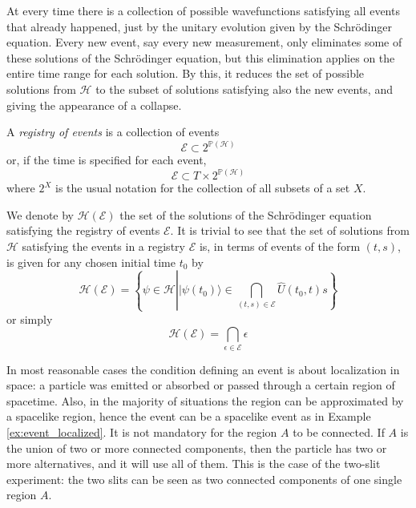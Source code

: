 \documentclass[11pt]{amsart}
\theoremstyle{definition}
\theoremstyle{plain}
\begin{document}
At every time there is a collection of possible wavefunctions satisfying all events that already happened, just by the unitary evolution given by the Schr\"odinger equation. Every new event, say every new measurement, only eliminates some of these solutions of the Schr\"odinger equation, but this elimination applies on the entire time range for each solution. By this, it reduces the set of possible solutions from $\mathscr{H}$ to the subset of solutions satisfying also the new events, and giving the appearance of a collapse.

A \emph{registry of events} is a collection of events
\begin{equation}
\mathcal E\subset 2^{\mathbb P(\mathscr{H})}
\end{equation}
or, if the time is specified for each event,
\begin{equation}
\mathcal E\subset T\times 2^{\mathbb P(\mathcal{H})}
\end{equation}
where $2^X$ is the usual notation for the collection of all subsets of a set $X$.

We denote by $\mathscr{H}(\mathcal E)$ the set of the solutions of the Schr\"odinger equation satisfying the registry of events $\mathcal E$.
It is trivial to see that the set of solutions from $\mathscr{H}$ satisfying the events in a registry $\mathcal E$ is,
in terms of events of the form $(t,s)$, is given for any chosen initial time $t_0$ by
\begin{equation}
\label{eq:registry_temporal}
\mathscr{H}(\mathcal E) = \left\{\psi\in\mathscr{H}\left||{\psi(t_0)}\rangle\in\bigcap_{(t,s)\in\mathcal E}\hat U(t_0,t)s\right\}\right.
\end{equation}
or simply
\begin{equation}
\label{eq:registry_timeless}
\mathscr{H}(\mathcal E)=\bigcap_{\epsilon\in\mathcal E}\epsilon
\end{equation}

In most reasonable cases the condition defining an event is about localization in space: a particle was emitted or absorbed or passed through a certain region of spacetime. Also, in the majority of situations the region can be approximated by a spacelike region, hence the event can be a spacelike event as in Example \ref{ex:event_localized}. It is not mandatory for the region $A$ to be connected. If $A$ is the union of two or more connected components, then the particle has two or more alternatives, and it will use all of them. This is the case of the two-slit experiment: the two slits can be seen as two connected components of one single region $A$.
\end{document}
